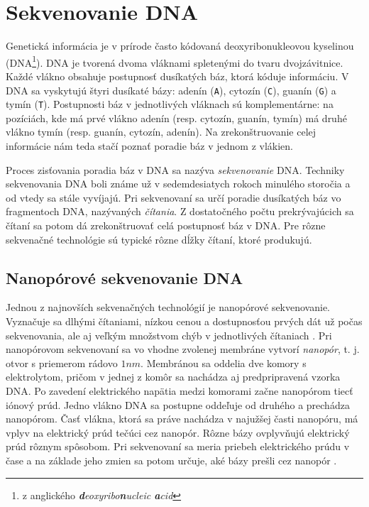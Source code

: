 \chapter{Sekvenovanie DNA}

\label{kap:sekvenovanie}

Genetická informácia je v prírode často kódovaná deoxyribonukleovou kyselinou (DNA\footnote{z anglického 
\emph{\textbf{d}eoxyribo\textbf{n}ucleic \textbf{a}cid}}). DNA je tvorená dvoma vláknami spletenými
do tvaru dvojzávitnice. Každé vlákno obsahuje postupnosť dusíkatých báz, ktorá kóduje informáciu. V DNA 
sa 
vyskytujú štyri
dusíkaté bázy: adenín (\texttt{A}), cytozín (\texttt{C}), guanín (\texttt{G}) a tymín (\texttt{T}). Postupnosti báz v jednotlivých vláknach 
sú 
komplementárne: na pozíciách, kde má prvé vlákno adenín 
(resp. cytozín, guanín, tymín) má druhé vlákno tymín (resp. guanín, cytozín, adenín). Na 
zrekonštruovanie 
celej informácie nám teda stačí poznať poradie báz v jednom z vlákien.

Proces zisťovania poradia báz v DNA sa nazýva \emph{sekvenovanie} DNA. Techniky sekvenovania DNA
boli známe už v sedemdesiatych rokoch minulého storočia a od vtedy sa stále vyvíjajú. Pri sekvenovaní
sa určí poradie dusíkatých báz vo fragmentoch DNA, nazývaných \emph{čítania}. Z dostatočného počtu 
prekrývajúcich sa čítaní sa potom dá zrekonštruovať celá postupnosť báz v DNA. Pre rôzne sekvenačné 
technológie sú typické rôzne dĺžky čítaní, ktoré produkujú.

\section{Nanopórové sekvenovanie DNA}

Jednou z najnovších sekvenačných technológií je nanopórové sekvenovanie. Vyznačuje sa dlhými čítaniami,
nízkou cenou a dostupnosťou prvých dát už počas sekvenovania, ale aj veľkým množstvom chýb v 
jednotlivých čítaniach \cite{Laver2015}. Pri nanopórovom sekvenovaní sa vo vhodne zvolenej membráne vytvorí 
\emph{nanopór}, t. j. otvor s priemerom rádovo $1 \si{nm}$. Membránou sa oddelia dve komory s 
elektrolytom, pričom v jednej z komôr sa nachádza aj predpripravená vzorka DNA.
Po zavedení elektrického napätia medzi komorami začne nanopórom tiecť iónový prúd. Jedno vlákno DNA
 sa postupne oddeľuje od druhého a prechádza nanopórom. Časť vlákna, 
ktorá sa práve nachádza v najužšej časti nanopóru, má vplyv na elektrický prúd tečúci cez nanopór. Rôzne 
bázy ovplyvňujú elektrický prúd rôznym spôsobom. Pri sekvenovaní sa meria priebeh elektrického prúdu v 
čase a na základe jeho zmien sa potom určuje, aké bázy prešli cez nanopór \cite{Branton2008}.

